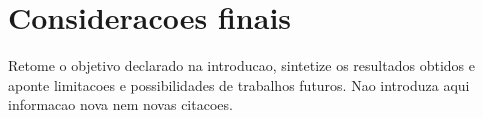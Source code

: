 \section{Consideracoes finais}
\label{sec:conclusao}

Retome o objetivo declarado na introducao, sintetize os resultados obtidos e
aponte limitacoes e possibilidades de trabalhos futuros. Nao introduza aqui
informacao nova nem novas citacoes.
